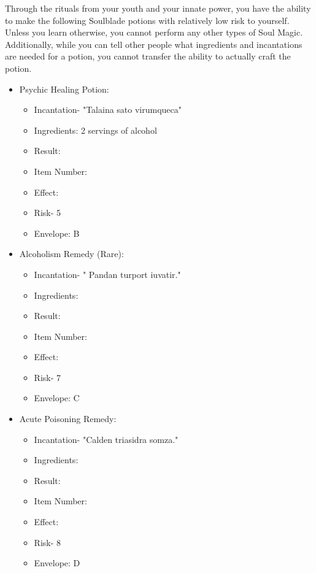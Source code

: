 \documentclass[green]{Kos}
\begin{document}
Through the rituals from your youth and your innate power, you have the ability to make the following Soulblade potions with relatively low risk to yourself. Unless you learn otherwise, you cannot perform any other types of Soul Magic. Additionally, while you can tell other people what ingredients and incantations are needed for a potion, you cannot transfer the ability to actually craft the potion.
\begin{itemize}
\item Psychic Healing Potion:
\begin{itemize}
\item Incantation- "Talaina sato virumqueca"
\item Ingredients: 2 servings of alcohol
\item Result: \iPsychicHealthRemedy{\MYname}
\item Item Number: \iPsychicHealthRemedy{\MYnumber}
\item Effect: \iPsychicHealthRemedy{\MYtext}
\item Risk- 5
\item Envelope: B
\end{itemize}
\item Alcoholism Remedy (Rare):
\begin{itemize}
\item Incantation- " Pandan turport iuvatir."
\item Ingredients: \iSugar{\MYname}
\item Result: \iAlcoholismRemedy{\MYname}
\item Item Number: \iAlcoholismRemedy{\MYnumber}
\item Effect: \iAlcoholismRemedy{\MYtext}
\item Risk- 7
\item Envelope: C
\end{itemize}
\item Acute Poisoning Remedy:
\begin{itemize}
\item Incantation- "Calden triasidra somza."
\item Ingredients: \iHerbs{\MYname}
\item Result: \iAcutePoisonRemedy{\MYname}
\item Item Number: \iAcutePoisonRemedy{\MYnumber}
\item Effect: \iAcutePoisonRemedy{\MYtext}
\item Risk- 8
\item Envelope: D
\end{itemize}
\end{itemize}
\end{document}
